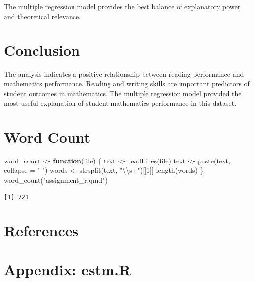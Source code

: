 \documentclass[
  letterpaper,
  DIV=11,
  numbers=noendperiod]{scrartcl}
\newenvironment{Shaded}{\begin{snugshade}}{\end{snugshade}}
\newcommand{\AttributeTok}[1]{\textcolor[rgb]{0.40,0.45,0.13}{#1}}
\newcommand{\ControlFlowTok}[1]{\textcolor[rgb]{0.00,0.23,0.31}{\textbf{#1}}}
\newcommand{\DecValTok}[1]{\textcolor[rgb]{0.68,0.00,0.00}{#1}}
\newcommand{\FunctionTok}[1]{\textcolor[rgb]{0.28,0.35,0.67}{#1}}
\newcommand{\NormalTok}[1]{\textcolor[rgb]{0.00,0.23,0.31}{#1}}
\newcommand{\OtherTok}[1]{\textcolor[rgb]{0.00,0.23,0.31}{#1}}
\newcommand{\SpecialCharTok}[1]{\textcolor[rgb]{0.37,0.37,0.37}{#1}}
\newcommand{\StringTok}[1]{\textcolor[rgb]{0.13,0.47,0.30}{#1}}
\begin{document}
The multiple regression model provides the best balance of explanatory
power and theoretical relevance.

\section{Conclusion}\label{conclusion}

The analysis indicates a positive relationship between reading
performance and mathematics performance. Reading and writing skills are
important predictors of student outcomes in mathematics. The multiple
regression model provided the most useful explanation of student
mathematics performance in this dataset.

\section{Word Count}\label{word-count}

\begin{Shaded}
\begin{Highlighting}[]
\NormalTok{word\_count }\OtherTok{\textless{}{-}} \ControlFlowTok{function}\NormalTok{(file) \{}
\NormalTok{  text }\OtherTok{\textless{}{-}} \FunctionTok{readLines}\NormalTok{(file)}
\NormalTok{  text }\OtherTok{\textless{}{-}} \FunctionTok{paste}\NormalTok{(text, }\AttributeTok{collapse =} \StringTok{" "}\NormalTok{)}
\NormalTok{  words }\OtherTok{\textless{}{-}} \FunctionTok{strsplit}\NormalTok{(text, }\StringTok{"}\SpecialCharTok{\textbackslash{}\textbackslash{}}\StringTok{s+"}\NormalTok{)[[}\DecValTok{1}\NormalTok{]]}
  \FunctionTok{length}\NormalTok{(words)}
\NormalTok{\}}
\FunctionTok{word\_count}\NormalTok{(}\StringTok{"assignment\_r.qmd"}\NormalTok{)}
\end{Highlighting}
\end{Shaded}

\begin{verbatim}
[1] 721
\end{verbatim}

\section{References}\label{references}

\protect{}\label{refs}

\section{Appendix: estm.R}\label{appendix-estm.r}
\end{document}
